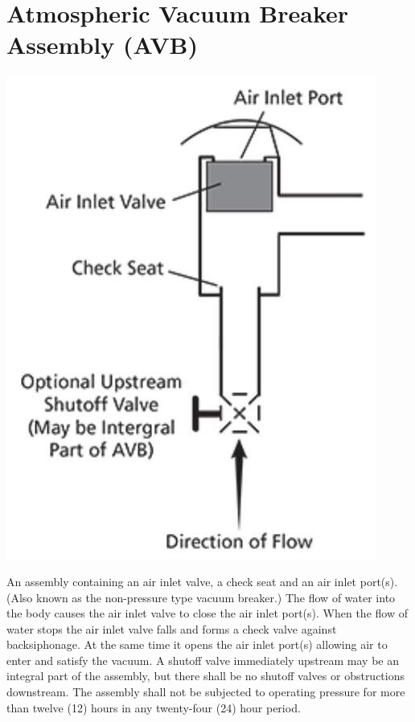 \documentclass[10pt]{article}
\begin{document}
\section{Atmospheric Vacuum Breaker Assembly (AVB)}
\includegraphics[max width=\textwidth]{AtmosphericVacuumBreaker(2)}

An assembly containing an air inlet valve, a check seat and an air inlet port(s). (Also known as the non-pressure type vacuum breaker.) The flow of water into the body causes the air inlet valve to close the air inlet port(s). When the flow of water stops the air inlet valve falls and forms a check valve against backsiphonage. At the same time it opens the air inlet port(s) allowing air to enter and satisfy the vacuum. A shutoff valve immediately upstream may be an integral part of the assembly, but there shall be no shutoff valves or obstructions downstream. The assembly shall not be subjected to operating pressure for more than twelve (12) hours in any twenty-four (24) hour period.
\end{document}
